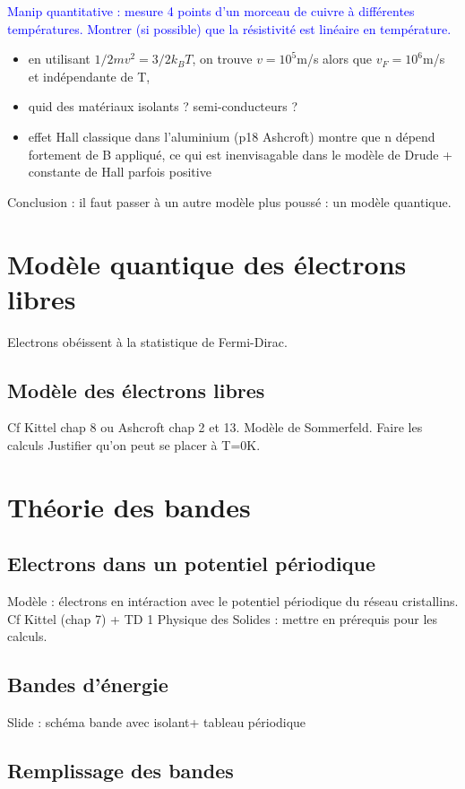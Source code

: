 \textcolor{blue}{Manip quantitative : mesure 4 points d'un morceau de cuivre à différentes températures. Montrer (si possible) que la résistivité est linéaire en température.}\\
\begin{itemize}
    \item en utilisant $1/2mv^2=3/2k_BT$, on trouve $v=10^5$m/s alors que $v_{F}=10^6$m/s et indépendante de T,
    \item quid des matériaux isolants ? semi-conducteurs ?
    \item effet Hall classique dans l'aluminium (p18 Ashcroft) montre que n dépend fortement de B appliqué, ce qui est inenvisagable dans le modèle de Drude + constante de Hall parfois positive
\end{itemize}

Conclusion : il faut passer à un autre modèle plus poussé : un modèle quantique.

\section{Modèle quantique des électrons libres}
Electrons obéissent à la statistique de Fermi-Dirac. 
\subsection{Modèle des électrons libres}
Cf Kittel chap 8 ou Ashcroft chap 2 et 13. Modèle de Sommerfeld. Faire les calculs Justifier qu'on peut se placer à T=0K.

\section{Théorie des bandes}

\subsection{Electrons dans un potentiel périodique}
Modèle : électrons en intéraction avec le potentiel périodique du réseau cristallins.\\
Cf Kittel (chap 7) + TD 1 Physique des Solides : mettre en prérequis pour les calculs.

\subsection{Bandes d'énergie}
Slide : schéma bande avec isolant+ tableau périodique 

\subsection{Remplissage des bandes}

